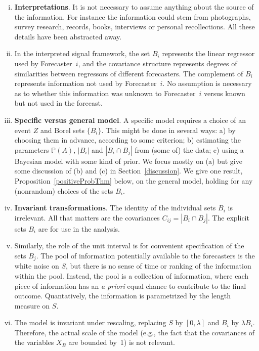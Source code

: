 \documentclass[11pt]{article}
\renewcommand{\P}{\mathbb{P}}
\theoremstyle{definition}
\theoremstyle{definition}
\def\P{{\mathbb P}}
\begin{document}
\begin{enumerate}[(i)]
\item {\bf Interpretations}. It is not necessary to assume anything 
about the source of the information.  For instance the information 
could stem from photographs, survey research, records, books, 
interviews or personal recollections.  All these details have 
been abstracted away.
\item In the interpreted signal framework, the set $B_i$ represents 
the linear regressor used by Forecaster~$i$, and the covariance 
structure represents degrees of similarities between regressors 
of different forecasters.  The complement of $B_i$ represents 
information not used by Forecaster~$i$.  No assumption is necessary
as to whether this information was unknown to Forecaster~$i$ versus
known but not used in the forecast.
\item {\bf Specific versus general model}. A specific model 
requires a choice of an event $Z$ and Borel sets $\{ B_i \}$.  
This might be done in several ways:
a) by choosing them in advance, according to some criterion;
b) estimating the parameters $\P(A)$, $|B_i|$ and $|B_i \cap B_j|$
from (some of) the data; c) using a Bayesian model with some kind of prior.  
We focus mostly on (a) but give some discussion of (b) and (c) in 
Section~\ref{discussion}.  We give one result, 
Proposition~\ref{positiveProbThm} below, on the general model, 
holding for any (nonrandom) choices of the sets $B_i$.
\label{item:specific}
\item {\bf Invariant transformations}.  The identity of the individual 
sets $B_i$ is irrelevant.  All that matters are the covariances $C_{ij} 
= |B_i \cap B_j|$.  The explicit sets $B_i$ are for use in the
analysis.
\item Similarly, the role of the unit interval is for convenient 
specification of the sets $B_j$.  The pool of information potentially
available to the forecasters is the white noise on $S$, but there is
no sense of time or ranking of the information within the pool. Instead,
the pool is a collection of information, where each piece of information
has an {\em a priori} equal chance to contribute to the final outcome.
Quantatively, the information is parametrized by the length measure on $S$.
\item The model is invariant under rescaling, replacing $S$
by $[0,\lambda]$ and $B_i$ by $\lambda B_i$.  Therefore, the
actual scale of the model (e.g., the fact that the covariances of 
the variables $X_B$ are bounded by~1) is not relevant. 

\end{enumerate}
\end{document}
